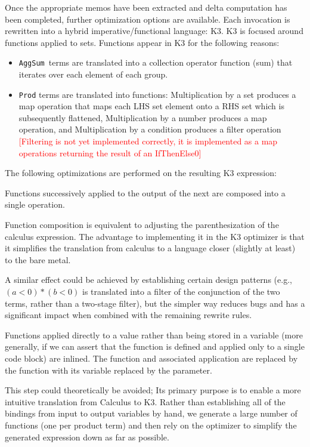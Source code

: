 \documentclass[11pt]{amsart}
\newcommand{\todo}[1]{\textcolor{red}{[#1]}}
\newcommand{\parsection}[1]{\smallskip\noindent{\bf #1.}}
\newcommand{\AggSum}{{\tt AggSum}\ }
\begin{document}
Once the appropriate memos have been extracted and delta computation has been completed, further optimization options are available.  Each invocation is rewritten into a hybrid imperative/functional language: K3.  K3 is focused around functions applied to sets.  Functions appear in K3 for the following reasons:
\begin{itemize}
\item \AggSum terms are translated into a collection operator function (sum) that iterates over each element of each group.
\item {\tt Prod} terms are translated into functions: Multiplication by a set produces a map operation that maps each LHS set element onto a RHS set which is subsequently flattened, Multiplication by a number produces a map operation, and Multiplication by a condition produces a filter operation \todo{Filtering is not yet implemented correctly, it is implemented as a map operations returning the result of an IfThenElse0}
\end{itemize}

The following optimizations are performed on the resulting K3 expression:

\parsection{Function Composition}
Functions successively applied to the output of the next are composed into a single operation.  

Function composition is equivalent to adjusting the parenthesization of the calculus expression.  The advantage to implementing it in the K3 optimizer is that it simplifies the translation from calculus to a language closer (slightly at least) to the bare metal.  

A similar effect could be achieved by establishing certain design patterns (e.g., $(a < 0) * (b < 0)$ is translated into a filter of the conjunction of the two terms, rather than a two-stage filter), but the simpler way reduces bugs and has a significant impact when combined with the remaining rewrite rules.

\parsection{Function Inlining}
Functions applied directly to a value rather than being stored in a variable (more generally, if we can assert that the function is defined and applied only to a single code block) are inlined.  The function and associated application are replaced by the function with its variable replaced by the parameter.

This step could theoretically be avoided; Its primary purpose is to enable a more intuitive translation from Calculus to K3.  Rather than establishing all of the bindings from input to output variables by hand, we generate a large number of functions (one per product term) and then rely on the optimizer to simplify the generated expression down as far as possible.
\end{document}
